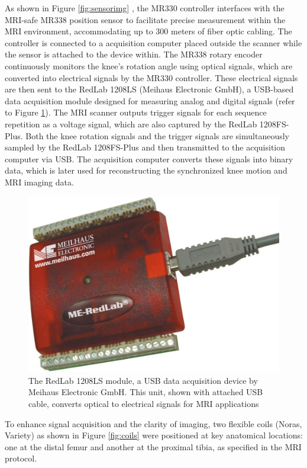 \documentclass{micro-econ-thesis}
\begin{document}
As shown in Figure \ref{fig:sensorimg} , the MR330 controller interfaces with the MRI-safe MR338 position sensor to facilitate precise measurement within the MRI environment, accommodating up to 300 meters of fiber optic cabling. The controller is connected to a acquisition computer placed outside the scanner while the sensor is attached to the device within. The MR338 rotary encoder continuously monitors the knee's rotation angle using optical signals, which are converted into electrical signals by the MR330 controller. These electrical signals are then sent to the RedLab 1208LS (Meihaus Electronic GmbH), a USB-based data acquisition module designed for measuring analog and digital signals (refer to Figure \ref{fig:redlab}). The MRI scanner outputs trigger signals for each sequence repetition as a voltage signal, which are also captured by the RedLab 1208FS-Plus. Both the knee rotation signals and the trigger signals are simultaneously sampled by the RedLab 1208FS-Plus and then transmitted to the acquisition computer via USB. The acquisition computer converts these signals into binary data, which is later used for reconstructing the synchronized knee motion and MRI imaging data.  
\begin{figure}[H]
	\centering
	\includegraphics[scale=0.1]{redlab}
	\caption{The RedLab 1208LS module, a USB data acquisition device by Meihaus Electronic GmbH. This unit, shown with attached USB cable, converts optical to electrical signals for MRI applications}
	\label{fig:redlab}
\end{figure}




To enhance signal acquisition and the clarity of imaging, two flexible coils (Noras, Variety) as shown in Figure \ref{fig:coils} were positioned at key anatomical locations: one at the distal femur and another at the proximal tibia, as specified in the MRI protocol. 
\end{document}
